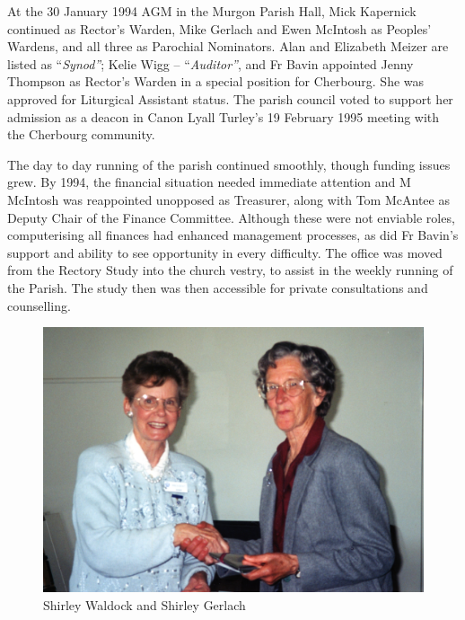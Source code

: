 At the 30 January 1994 AGM in the Murgon Parish Hall, Mick Kapernick continued as Rector's Warden, Mike Gerlach and Ewen McIntosh as Peoples' Wardens, and all three as Parochial Nominators. Alan and Elizabeth Meizer are listed as ``\emph{Synod''}; Kelie Wigg -- ``\emph{Auditor''}, and Fr Bavin appointed Jenny Thompson as Rector's Warden in a special position for Cherbourg. She was approved for Liturgical Assistant status. The parish council voted to support her admission as a deacon in Canon Lyall Turley's 19 February 1995 meeting with the Cherbourg community.



The day to day running of the parish continued smoothly, though funding issues grew. By 1994, the financial situation needed immediate attention and M McIntosh was reappointed unopposed as Treasurer, along with Tom McAntee as Deputy Chair of the Finance Committee. Although these were not enviable roles, computerising all finances had enhanced management processes, as did Fr Bavin's support and ability to see opportunity in every difficulty. The office was moved from the Rectory Study into the church vestry, to assist in the weekly running of the Parish. The study then was then accessible for private consultations and counselling.









\begin{figure}
\begin{center}
\includegraphics[width=1.\linewidth,center]{../images/waldockGerlach.jpg}
\caption{Shirley Waldock and Shirley Gerlach}
\end{center}
\end{figure}





